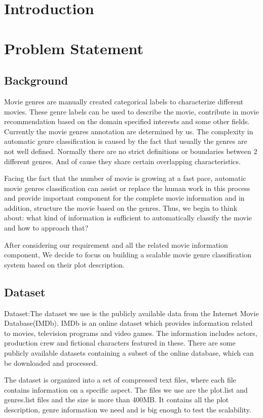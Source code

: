 \documentclass{vldb}
\begin{document}
\section{Introduction}

\section{Problem Statement}
\subsection{Background}
Movie genres are manually created categorical labels to characterize different movies. These genre labels can be used to describe the movie, contribute in movie recommendation based on the domain specified interests and some other fields. Currently the movie genres annotation are determined by us. The complexity in automatic genre classification is caused by the fact that usually the genres are not well  defined. Normally there are no strict definitions or boundaries between 2 different genres.  And of cause they share certain overlapping characteristics.
\par Facing the fact that the number of movie is growing at a fast pace, automatic movie genres classification can assist or replace the human work in this process and provide important component for the complete movie information and in addition, structure the movie based on the genres. Thus, we begin to think about: what kind of information is sufficient to automatically classify the movie and how to approach that?
\par After considering our requirement and all the related movie information component, We decide to focus on building a scalable movie genre classification system based on their plot description. 

\subsection{Dataset} 
Dataset:The dataset we use is the publicly available data from the Internet Movie Database(IMDb). IMDb is an online dataset which provides information related to movies, television programs and video games. The information includes actors, production crew and fictional characters featured in these. There are some publicly available datasets containing a subset of the online database, which can be downloaded and processed. 
\par The dataset is organized into a set of compressed text files, where each file contains information on a specific aspect. The files we use are the plot.list and genres.list files and the size is more than 400MB. It contains all the plot description, genre information we need and is big enough to test the scalability.
\end{document}
